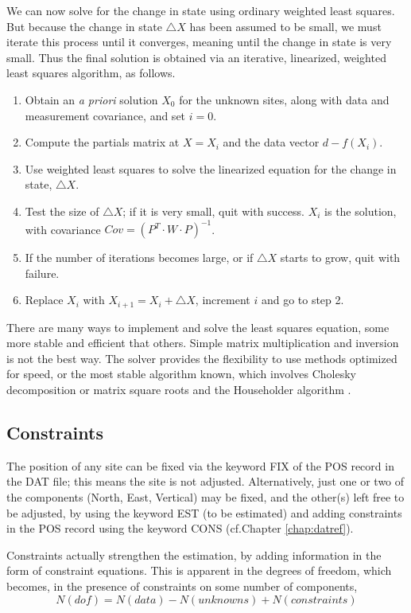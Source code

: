 We can now solve for the change in state using ordinary weighted least squares. But because the change in state $\triangle X$ has been assumed to be small, we must iterate this process until it converges, meaning until the change in state is very small. Thus the final solution is obtained via an iterative, linearized, weighted least squares algorithm, as follows.
\begin{enumerate}
\item Obtain an \emph{a priori} solution $X_0$ for the unknown sites, along with data and measurement covariance, and set $i = 0$.
\item Compute the partials matrix at $X = X_i$ and the data vector $d - f(X_i)$.
\item Use weighted least squares to solve the linearized equation for the change in state, $\triangle X$.
\item Test the size of $\triangle X$; if it is very small, quit with success. $X_i$ is the solution, with covariance $Cov = (P^T \cdot W \cdot P)^{-1}$.
\item If the number of iterations becomes large, or if $\triangle X$ starts to grow, quit with failure.
\item Replace $X_i$ with $X_{i+1} = X_i + \triangle X$, increment $i$ and go to step 2.
\end{enumerate}

There are many ways to implement and solve the least squares equation, some more stable and efficient that others. Simple matrix multiplication and inversion is not the best way. The solver provides the flexibility to use methods optimized for speed, or the most stable algorithm known, which involves Cholesky decomposition or matrix square roots and the Householder algorithm \cite{biermann}.

\subsection{Constraints}
The position of any site can be fixed via the keyword FIX of the POS record in the DAT file; this means the site is not adjusted. Alternatively, just one or two of the components (North, East, Vertical) may be fixed, and the other(s) left free to be adjusted, by using the keyword EST (to be estimated) and adding constraints in the POS record using the keyword CONS (cf.Chapter \ref{chap:datref}).

Constraints actually strengthen the estimation, by adding information in the form of constraint equations. This is apparent in the degrees of freedom, which becomes, in the presence of constraints on some number of components,
\begin{equation}
N(dof) = N(data) - N(unknowns) + N(constraints)
\end{equation}

